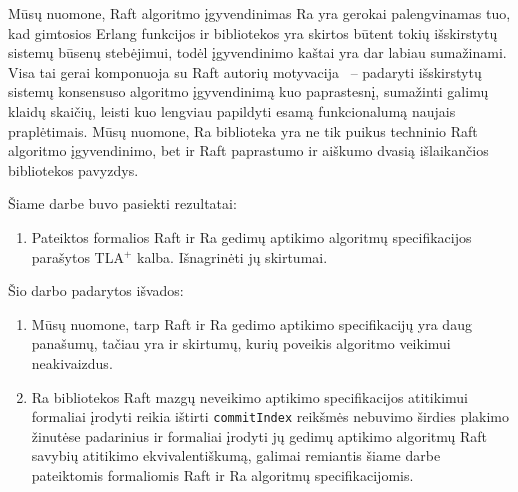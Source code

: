 \documentclass{VUMIFPSkursinis}
\begin{document}

Mūsų nuomone, Raft algoritmo įgyvendinimas Ra yra gerokai palengvinamas tuo, kad gimtosios Erlang funkcijos ir bibliotekos yra skirtos būtent tokių išskirstytų sistemų būsenų stebėjimui, todėl įgyvendinimo kaštai yra dar labiau sumažinami. Visa tai gerai komponuoja su Raft autorių motyvacija~\cite{ongaro_consensus} -- padaryti išskirstytų sistemų konsensuso algoritmo įgyvendinimą kuo paprastesnį, sumažinti galimų klaidų skaičių, leisti kuo lengviau papildyti esamą funkcionalumą naujais praplėtimais. Mūsų nuomone, Ra biblioteka yra ne tik puikus techninio Raft algoritmo įgyvendinimo, bet ir Raft paprastumo ir aiškumo dvasią išlaikančios bibliotekos pavyzdys. 

Šiame darbe buvo pasiekti rezultatai:
\begin{enumerate}
\item Pateiktos formalios Raft ir Ra gedimų aptikimo algoritmų specifikacijos parašytos TLA$^+$ kalba. Išnagrinėti jų skirtumai.
\end{enumerate}

Šio darbo padarytos išvados:
\begin{enumerate}
\item Mūsų nuomone, tarp Raft ir Ra gedimo aptikimo specifikacijų yra daug panašumų, tačiau yra ir skirtumų, kurių poveikis algoritmo veikimui neakivaizdus.
\item Ra bibliotekos Raft mazgų neveikimo aptikimo specifikacijos atitikimui formaliai įrodyti reikia ištirti \texttt{commitIndex} reikšmės nebuvimo širdies plakimo žinutėse padarinius ir formaliai įrodyti jų gedimų aptikimo algoritmų Raft savybių atitikimo ekvivalentiškumą, galimai remiantis šiame darbe pateiktomis formaliomis Raft ir Ra algoritmų specifikacijomis.
\end{enumerate}


\printbibliography[heading=bibintoc]  %
\end{document}
